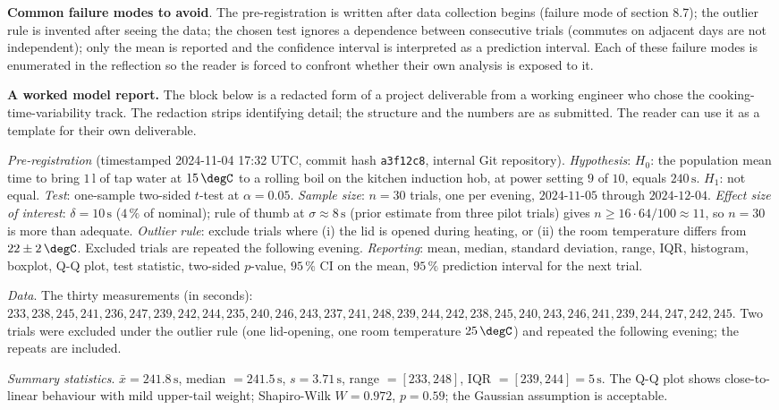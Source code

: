 \begin{project}
\textbf{Common failure modes to avoid}. The pre-registration is
written after data collection begins (failure mode of section 8.7);
the outlier rule is invented after seeing the data; the chosen
test ignores a dependence between consecutive trials (commutes on
adjacent days are not independent); only the mean is reported and
the confidence interval is interpreted as a prediction interval.
Each of these failure modes is enumerated in the reflection so the
reader is forced to confront whether their own analysis is exposed
to it.

\textbf{A worked model report.} The block below is a redacted
form of a project deliverable from a working engineer who chose
the cooking-time-variability track. The redaction strips
identifying detail; the structure and the numbers are as
submitted. The reader can use it as a template for their own
deliverable.

\smallskip
\textit{Pre-registration} (timestamped 2024-11-04 17:32 UTC,
commit hash \texttt{a3f12c8}, internal Git repository).
\emph{Hypothesis}: $H_{0}$: the population mean time to bring
$1\,\si{\litre}$ of tap water at $15\,\degC$ to a rolling boil on
the kitchen induction hob, at power setting $9$ of $10$, equals
$240\,\si{\second}$. $H_{1}$: not equal.
\emph{Test}: one-sample two-sided $t$-test at $\alpha = 0.05$.
\emph{Sample size}: $n = 30$ trials, one per evening, $2024
\text{-}11\text{-}05$ through $2024\text{-}12\text{-}04$.
\emph{Effect size of interest}: $\delta = 10\,\si{\second}$
($4 \,\%$ of nominal); rule of thumb at $\sigma \approx
8\,\si{\second}$ (prior estimate from three pilot trials) gives
$n \geq 16 \cdot 64/100 \approx 11$, so $n = 30$ is more than
adequate.
\emph{Outlier rule}: exclude trials where (i) the lid is opened
during heating, or (ii) the room temperature differs from
$22 \pm 2 \,\degC$. Excluded trials are repeated the following
evening. \emph{Reporting}: mean, median, standard deviation,
range, IQR, histogram, boxplot, Q-Q plot, test statistic,
two-sided $p$-value, $95 \,\%$ CI on the mean, $95 \,\%$
prediction interval for the next trial.

\smallskip
\textit{Data}. The thirty measurements (in seconds):
$233, 238, 245, 241, 236, 247, 239, 242, 244, 235, 240, 246,
243, 237, 241, 248, 239, 244, 242, 238, 245, 240, 243, 246,
241, 239, 244, 247, 242, 245$. Two trials were excluded under
the outlier rule (one lid-opening, one room temperature
$25 \,\degC$) and repeated the following evening; the repeats
are included.

\smallskip
\textit{Summary statistics}.
$\bar{x} = 241.8\,\si{\second}$,
median $= 241.5\,\si{\second}$,
$s = 3.71\,\si{\second}$,
range $= [233, 248]$,
IQR $= [239, 244] = 5\,\si{\second}$.
The Q-Q plot shows close-to-linear behaviour with mild upper-tail
weight; Shapiro-Wilk $W = 0.972$, $p = 0.59$; the Gaussian
assumption is acceptable.


\end{project}
